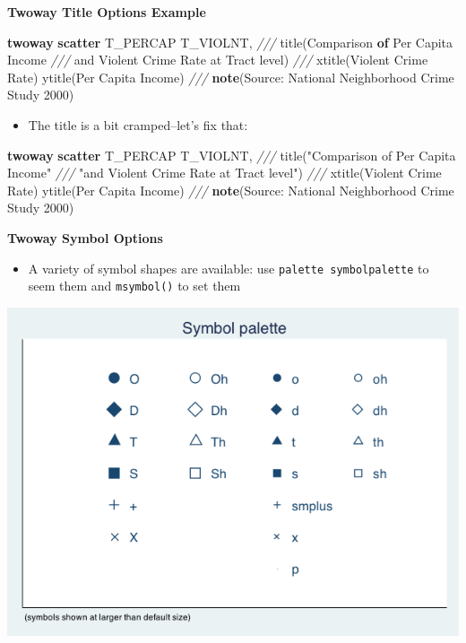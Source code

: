 \documentclass[
]{book}
\newenvironment{Shaded}{\begin{snugshade}}{\end{snugshade}}
\newcommand{\BaseNTok}[1]{\textcolor[rgb]{0.00,0.00,0.81}{#1}}
\newcommand{\CommentTok}[1]{\textcolor[rgb]{0.56,0.35,0.01}{\textit{#1}}}
\newcommand{\DecValTok}[1]{\textcolor[rgb]{0.00,0.00,0.81}{#1}}
\newcommand{\FunctionTok}[1]{\textcolor[rgb]{0.00,0.00,0.00}{#1}}
\newcommand{\KeywordTok}[1]{\textcolor[rgb]{0.13,0.29,0.53}{\textbf{#1}}}
\newcommand{\NormalTok}[1]{#1}
\newcommand{\StringTok}[1]{\textcolor[rgb]{0.31,0.60,0.02}{#1}}
\providecommand{\tightlist}{%
  \setlength{\itemsep}{0pt}\setlength{\parskip}{0pt}}
\begin{document}
\textbf{Twoway Title Options Example}

\begin{Shaded}
\begin{Highlighting}[]
  \KeywordTok{twoway} \KeywordTok{scatter}\NormalTok{ T_PERCAP T_VIOLNT, }\CommentTok{///}
      \BaseNTok{title}\NormalTok{(Comparison }\KeywordTok{of}\NormalTok{ Per Capita Income }\CommentTok{///}
\NormalTok{            and Violent Crime Rate }\FunctionTok{at}\NormalTok{ Tract }\DecValTok{level}\NormalTok{) }\CommentTok{///}
  \BaseNTok{xtitle}\NormalTok{(Violent Crime Rate) }\BaseNTok{ytitle}\NormalTok{(Per Capita Income) }\CommentTok{///}
      \KeywordTok{note}\NormalTok{(Source: National Neighborhood Crime Study 2000) }
\end{Highlighting}
\end{Shaded}

\begin{itemize}
\tightlist
\item
  The title is a bit cramped--let's fix that:
\end{itemize}

\begin{Shaded}
\begin{Highlighting}[]
  \KeywordTok{twoway} \KeywordTok{scatter}\NormalTok{ T_PERCAP T_VIOLNT, }\CommentTok{///}
      \BaseNTok{title}\NormalTok{(}\StringTok{"Comparison of Per Capita Income"} \CommentTok{///}
  \StringTok{"and Violent Crime Rate at Tract level"}\NormalTok{) }\CommentTok{///}
  \BaseNTok{xtitle}\NormalTok{(Violent Crime Rate) }\BaseNTok{ytitle}\NormalTok{(Per Capita Income) }\CommentTok{///}
  \KeywordTok{note}\NormalTok{(Source: National Neighborhood Crime Study 2000) }
\end{Highlighting}
\end{Shaded}

\textbf{Twoway Symbol Options}

\begin{itemize}
\tightlist
\item
  A variety of symbol shapes are available: use \texttt{palette\ symbolpalette} to seem them and \texttt{msymbol()} to set them
\end{itemize}

\includegraphics{Stata/StataModGraph/images/Symbol.png}
\end{document}
